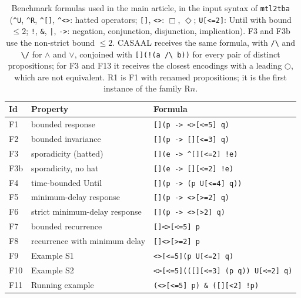 \begin{table}[t]
\centering
\caption{Benchmark formulas used in the main article, in the input syntax of \texttt{mtl2tba} (\texttt{\^{}U}, \texttt{\^{}R}, \texttt{\^{}[]}, \texttt{\^{}<>}: hatted operators; \texttt{[]}, \texttt{<>}: $\Box$, $\Diamond$; \texttt{U[<=2]}: Until with bound $\le2$; \texttt{!}, \texttt{\&}, \texttt{|}, \texttt{->}: negation, conjunction, disjunction, implication).  F3 and F3b use the non-strict bound $\le2$.  CASAAL receives the same formula, with \texttt{/\textbackslash} and \texttt{\textbackslash/} for $\wedge$ and $\vee$, conjoined with \texttt{[](!(a /\textbackslash{} b))} for every pair of distinct propositions; for F3 and F13 it receives the closest encodings with a leading $\bigcirc$, which are not equivalent.  R1 is F1 with renamed propositions; it is the first instance of the family R$n$.}
\label{tab:formulas}
\small
\begin{tabular}{@{}llp{}@{}}
\toprule
Id & Property & Formula\\
\midrule
F1 & bounded response & \texttt{[](p -\textgreater{} \textless{}\textgreater{}[\textless{}=5] q)}\\
F2 & bounded invariance & \texttt{[](p -\textgreater{} [][\textless{}=3] q)}\\
F3 & sporadicity (hatted) & \texttt{[](e -\textgreater{} \^{}[][\textless{}=2] !e)}\\
F3b & sporadicity, no hat & \texttt{[](e -\textgreater{} [][\textless{}=2] !e)}\\
F4 & time-bounded Until & \texttt{[](p -\textgreater{} (p U[\textless{}=4] q))}\\
F5 & minimum-delay response & \texttt{[](p -\textgreater{} \textless{}\textgreater{}[\textgreater{}=2] q)}\\
F6 & strict minimum-delay response & \texttt{[](p -\textgreater{} \textless{}\textgreater{}[\textgreater{}2] q)}\\
F7 & bounded recurrence & \texttt{[]\textless{}\textgreater{}[\textless{}=5] p}\\
F8 & recurrence with minimum delay & \texttt{[]\textless{}\textgreater{}[\textgreater{}=2] p}\\
F9 & Example S1 & \texttt{\textless{}\textgreater{}[\textless{}=5](p U[\textless{}=2] q)}\\
F10 & Example S2 & \texttt{\textless{}\textgreater{}[\textless{}=5](([][\textless{}=3] (p \textbar{} q)) U[\textless{}=2] q)}\\
F11 & Running example & \texttt{(\textless{}\textgreater{}[\textless{}=5] p) \& ([][\textless{}2] !p)}\\

\end{tabular}
\end{table}
